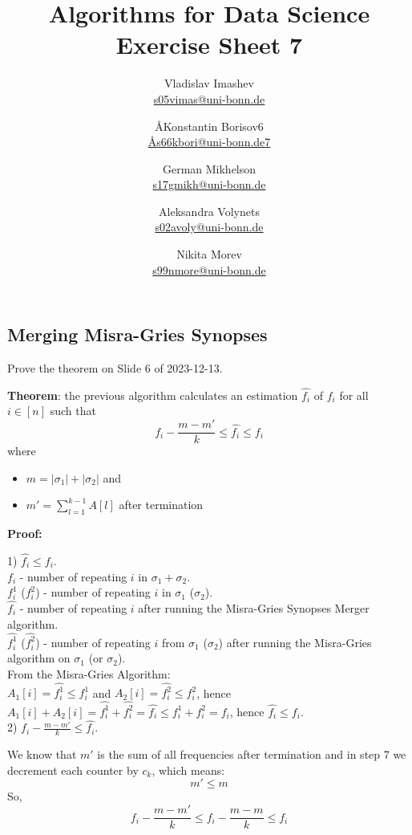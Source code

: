 \documentclass{article}
\title{Algorithms for Data Science \\ Exercise Sheet 7}
\author{
  Vladislav Imashev \\ \href{mailto:s05vimas@uni-bonn.de}{s05vimas@uni-bonn.de} \and
  \AA{Konstantin Borisov}{6} \\ \href{mailto:\AA{s66kbori@uni-bonn.de}{7}}{\AA{s66kbori@uni-bonn.de}{7}} \and
  German Mikhelson \\ \href{mailto:s17gmikh@uni-bonn.de}{s17gmikh@uni-bonn.de} \and
  Aleksandra Volynets \\ \href{mailto:s02avoly@uni-bonn.de}{s02avoly@uni-bonn.de} \and
  Nikita Morev \\ \href{mailto:s99nmore@uni-bonn.de}{s99nmore@uni-bonn.de}
}
\begin{document}
  \maketitle

  \setcounter{section}{7}
  \subsection{Merging Misra-Gries Synopses}
  \begin{centerframebox}
    Prove the theorem on Slide 6 of 2023-12-13.

    \textbf{Theorem}: the previous algorithm calculates an estimation $\hat{f_i}$ of $f_i$ for all $i \in [n]$ such that
    \[ f_i - \frac{m-m'}{k} \leq \hat{f_i} \leq f_i \]
    where
    \begin{itemize}
      \item $m = |\sigma_1| + |\sigma_2|$ and
      \item $m' = \sum_{l=1}^{k-1} A[l]$ after termination
    \end{itemize}
  \end{centerframebox}

  \textbf{Proof:}

  1) $\hat{f_i} \leq f_i$. \\
  $f_i$ - number of repeating $i$ in $\sigma_1 + \sigma_2$. \\
  $f^1_i$ ($f^2_i$) - number of repeating $i$ in $\sigma_1$ ($\sigma_2$). \\
  $\hat{f_i}$ - number of repeating $i$ after running the Misra-Gries Synopses Merger algorithm. \\
  $\hat{f^1_i}$ ($\hat{f^2_i}$) - number of repeating $i$ from $\sigma_1$ ($\sigma_2$) after running the Misra-Gries algorithm on $\sigma_1$ (or $\sigma_2$). \\

  From the Misra-Gries Algorithm: \\
  $A_1[i] = \hat{f^1_i} \leq f^1_i$ and $A_2[i] = \hat{f^2_i} \leq f^2_i$, hence $A_1[i] + A_2[i] = \hat{f^1_i} + \hat{f^2_i} = \hat{f_i} \leq f^1_i + f^2_i = f_i$, hence $\hat{f_i} \leq f_i$. \\

  2) $f_i - \frac{m-m'}{k} \leq \hat{f_i}$.

  We know that $m'$ is the sum of all frequencies after termination and in step 7 we decrement each counter by $c_k$, which means:
  \[m' \leq m\]
  So,
  \[f_i - \frac{m-m'}{k} \leq f_i - \frac{m-m}{k} \leq f_i\]
\end{document}
